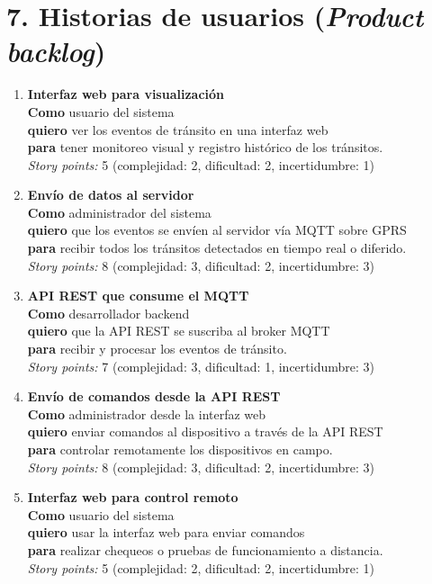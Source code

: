 \documentclass[
11pt, %
]{charter}
\begin{document}
\section{7. Historias de usuarios (\textit{Product backlog})}
\label{sec:backlog}

\begin{enumerate}

\item \textbf{Interfaz web para visualización}\\
\textbf{Como} usuario del sistema\\
\textbf{quiero} ver los eventos de tránsito en una interfaz web\\
\textbf{para} tener monitoreo visual y registro histórico de los tránsitos.\\
\textit{Story points:} 5 (complejidad: 2, dificultad: 2, incertidumbre: 1)

\item \textbf{Envío de datos al servidor}\\
\textbf{Como} administrador del sistema\\
\textbf{quiero} que los eventos se envíen al servidor vía MQTT sobre GPRS\\
\textbf{para} recibir todos los tránsitos detectados en tiempo real o diferido.\\
\textit{Story points:} 8 (complejidad: 3, dificultad: 2, incertidumbre: 3)

\item \textbf{API REST que consume el MQTT}\\
\textbf{Como} desarrollador backend\\
\textbf{quiero} que la API REST se suscriba al broker MQTT\\
\textbf{para} recibir y procesar los eventos de tránsito.\\
\textit{Story points:} 7 (complejidad: 3, dificultad: 1, incertidumbre: 3)

\item \textbf{Envío de comandos desde la API REST}\\
\textbf{Como} administrador desde la interfaz web\\
\textbf{quiero} enviar comandos al dispositivo a través de la API REST\\
\textbf{para} controlar remotamente los dispositivos en campo.\\
\textit{Story points:} 8 (complejidad: 3, dificultad: 2, incertidumbre: 3)

\item \textbf{Interfaz web para control remoto}\\
\textbf{Como} usuario del sistema\\
\textbf{quiero} usar la interfaz web para enviar comandos\\
\textbf{para} realizar chequeos o pruebas de funcionamiento a distancia.\\
\textit{Story points:} 5 (complejidad: 2, dificultad: 2, incertidumbre: 1)


\end{enumerate}
\end{document}
